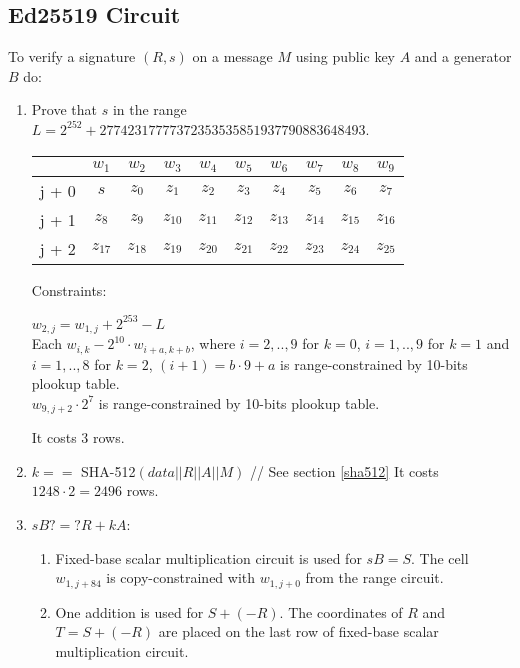 \subsection{Ed25519 Circuit}
\label{section:eddsa}

To verify a signature $(R,s)$ on a message $M$ using public key $A$ and a generator $B$ do:
\begin{enumerate}
    \item Prove that $s$ in the range $L = 2^{252}+27742317777372353535851937790883648493$.
        \begin{center}
    \begin{tabular}{ c|c|c|c|c|c|c|c|c|c }
        & $w_1$  & $w_2$  & $w_3$  & $w_4$  & $w_5$  & $w_6$ & $w_7$ & $w_8$ & $w_9$  \\
            \hline
                j + 0 & $s$ & $z_0$ & $z_1$ & $z_2$ & $z_3$ & $z_4$ & $z_5$ & $z_6$ & $z_7$ \\
                j + 1 & $z_8$ & $z_{9}$ & $z_{10}$ & $z_{11}$ & $z_{12}$ & $z_{13}$ & $z_{14}$ & $z_{15}$ & $z_{16}$ \\
                j + 2 & $z_{17}$ & $z_{18}$ & $z_{19}$ & $z_{20}$ & $z_{21}$ & $z_{22}$ & $z_{23}$ & $z_{24}$ & $z_{25}$ \\
            \end{tabular}
        \end{center}
        Constraints:
        \begin{center}
            $w_{2, j} = w_{1,j} + 2^{253} - L $ \\
            Each $w_{i,k} - 2^{10} \cdot w_{i + a, k + b} $, where $i = 2,..,9$ for $k = 0$, $i = 1,..,9$ for $k = 1$ and $i = 1,..,8$ for $k = 2$, $(i + 1) = b \cdot 9 + a$  is range-constrained by 10-bits plookup table. \\
            $w_{9,j+2} \cdot 2^7 $ is range-constrained by 10-bits plookup table.
        \end{center}
	It costs $3$ rows.
    \item $k ==$ SHA-512$(data||R||A||M)$ // See section \ref{sha512}
    It costs $1248 \cdot 2 = 2496$ rows.
    \item $sB ?=? R + kA$:
        \begin{enumerate}
            \item Fixed-base scalar multiplication circuit is used for $sB = S$. The cell $w_{1, j + 84}$ is copy-constrained with $w_{1, j + 0}$ from the range circuit.
            \item One addition is used for $S + (-R)$. The coordinates of $R$ and $T = S + (-R)$ are placed on the last row of fixed-base scalar multiplication circuit.

\end{enumerate}
\end{enumerate}
